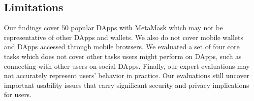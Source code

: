 \documentclass[conference]{IEEEtran}
\begin{document}


\subsection{Limitations}
Our findings cover 50 popular DApps with MetaMask which may not be representative of other DApps and wallets.
We also do not cover mobile wallets and DApps accessed through mobile browsers. %
We evaluated a set of four core tasks which does not cover other tasks users might perform on DApps, such as connecting with other users on social DApps.
Finally, our expert evaluations may not accurately represent users' behavior in practice. %
Our evaluations still uncover important usability issues that carry significant security and privacy implications for users.






\end{document}

